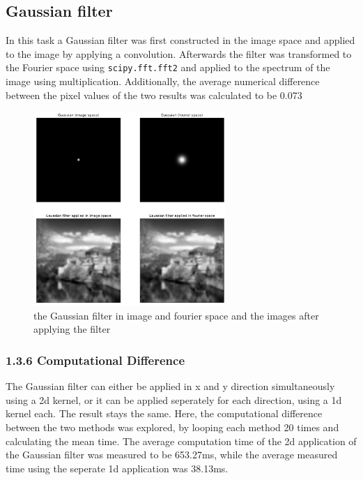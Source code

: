 \documentclass{article}
\begin{document}
    \subsection{Gaussian filter}
    In this task a Gaussian filter was first constructed in the image space and applied to the image by applying a convolution.
    Afterwards the filter was transformed to the Fourier space using \verb|scipy.fft.fft2| and applied to the spectrum of the image using multiplication.
    Additionally, the average numerical difference between the pixel values of the two results was calculated to be 0.073

    \begin{figure}[H]
        \centering
        \includegraphics[width = 0.65\textwidth]{gaussian.png}
        \caption{the Gaussian filter in image and fourier space and the images after applying the filter}
        \label{fig:gaussianfilter}
    \end{figure}

    \subsubsection*{1.3.6 Computational Difference}
    The Gaussian filter can either be applied in x and y direction simultaneously using a 2d kernel,
    or it can be applied seperately for each direction, using a 1d kernel each. The result stays the same.
    Here, the computational difference between the two methods was explored, by looping each method 20 times and calculating the mean time.
    The average computation time of the 2d application of the Gaussian filter was measured to be 653.27ms, while the average measured time using the seperate 1d application was 38.13ms.
\end{document}
